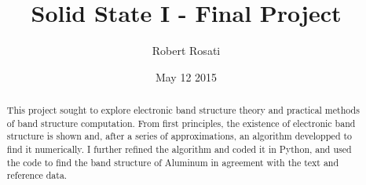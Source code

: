 \documentclass[12pt]{article}
\begin{document}
\singlespacing
\title{Solid State I - Final Project}
\date{May 12 2015}
\author{Robert Rosati}
\maketitle

\begin{abstract}
\par This project sought to explore electronic band structure theory and practical methods of band structure computation. From first principles, the existence of electronic band structure is shown and, after a series of approximations, an algorithm developped to find it numerically. I further refined the algorithm and coded it in Python, and used the code to find the band structure of Aluminum in agreement with the text and reference data.
\end{abstract}

\doublespacing
\end{document}
